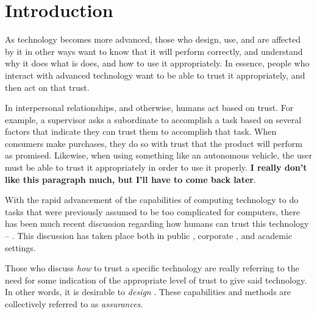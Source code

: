 \section{Introduction}
    As technology becomes more advanced, those who design, use, and are affected by it in other ways want to know that it will perform correctly, and understand why it does what is does, and how to use it appropriately. In essence, people who interact with advanced technology want to be able to trust it appropriately, and then act on that trust.

    In interpersonal relationships, and otherwise, humans act based on trust. For example, a supervisor asks a subordinate to accomplish a task based on several factors that indicate they can trust them to accomplish that task. When consumers make purchases, they do so with trust that the product will perform as promised. Likewise, when using something like an autonomous vehicle, the user must be able to trust it appropriately in order to use it properly. \textbf{I really don't like this paragraph much, but I'll have to come back later}.

    With the rapid advancement of the capabilities of  computing technology to do tasks that were previously assumed to be too complicated for computers, there has been much recent discussion regarding how humans can trust this technology -- . 
    This discussion has taken place both in public \cite{Spectrum2016-jv,DeSteno2014-cq,Cranz2017-yh,Cassel2017-tn,Danks_undated-sb}, corporate \cite{Banavar2016-nm, Khosravi2016-ke,Moody2017-vd,Rudnitsky2017-in,Benioff2016-tc}, and academic \cite{Groom2007-bz,Lloyd_undated-bb,Goodrum_2016-fm,Foley2017-qj,Ghahramani2015-yq,Castelvecchi2016-mr} settings.

    Those who discuss \emph{how} to trust a specific technology are really referring to the need for %
    some indication of the appropriate level of trust to give said technology. In other words, it is desirable to \emph{design} . These capabilities and methods are collectively referred to as \emph{assurances}. %
    
